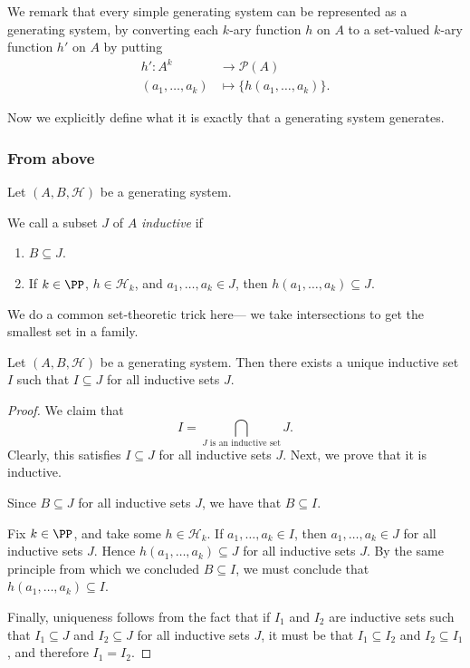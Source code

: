 \documentclass{article}
\newcommand{\powerset}[1]{\ensuremath{\mathscr{P}\left(#1\right)}}
\begin{document}
We remark that every simple generating system can be represented as a generating system, by converting each $k$-ary function $h$ on $A$ to a set-valued $k$-ary function $h'$ on $A$ by putting
\begin{align*}
    h': A^k &\to \powerset{A} \\
    (a_1,\ldots,a_k) &\mapsto \{h(a_1,\ldots,a_k)\}.
\end{align*}

Now we explicitly define what it is exactly that a generating system generates.

\subsubsection*{From above}

\begin{definition}
    Let $(A,B,\mathcal{H})$ be a generating system.

    We call a subset $J$ of $A$ \textit{inductive} if
    \begin{enumerate}[label=(\roman*)]
        \item $B \subseteq J$.
        \item If $k \in \PP$, $h \in \mathcal{H}_k$, and $a_1,\ldots,a_k \in J$, then $h(a_1,\ldots,a_k) \subseteq J$.
    \end{enumerate}
\end{definition}

We do a common set-theoretic trick here--- we take intersections to get the smallest set in a family.

\begin{proposition}
    Let $(A, B, \mathcal{H})$ be a generating system.
    Then there exists a unique inductive set $I$ such that $I \subseteq J$ for all inductive sets $J$.
\end{proposition}

\begin{proof}
    We claim that
    \[
        I
        =
        \bigcap_{J\text{ is an inductive set}}J.
    \]
    Clearly, this satisfies $I \subseteq J$ for all inductive sets $J$.
    Next, we prove that it is inductive.

    Since $B \subseteq J$ for all inductive sets $J$, we have that $B \subseteq I$.

    Fix $k \in \PP$, and take some $h \in \mathcal{H}_k$.
    If $a_1,\ldots,a_k \in I$, then $a_1,\ldots,a_k \in J$ for all inductive sets $J$.
    Hence $h(a_1,\ldots,a_k) \subseteq J$ for all inductive sets $J$.
    By the same principle from which we concluded $B \subseteq I$, we must conclude that $h(a_1,\ldots,a_k) \subseteq I$.

    Finally, uniqueness follows from the fact that if $I_1$ and $I_2$ are inductive sets such that $I_1 \subseteq J$ and $I_2 \subseteq J$ for all inductive sets $J$, it must be that $I_1 \subseteq I_2$ and $I_2 \subseteq I_1$, and therefore $I_1 = I_2$.
\end{proof}
\end{document}
